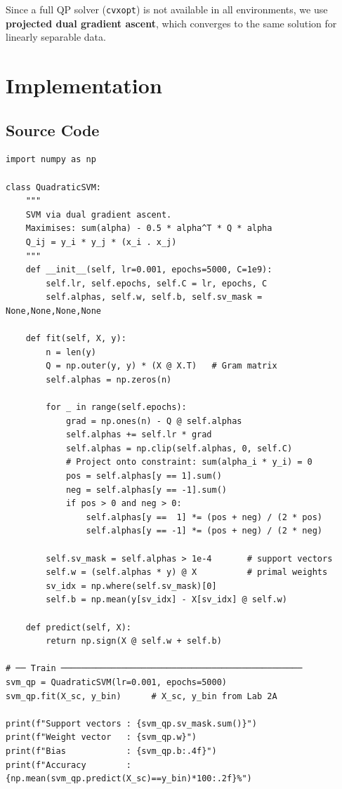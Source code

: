 \documentclass[12pt,a4paper]{article}
\begin{document}
Since a full QP solver (\texttt{cvxopt}) is not available in all environments, we use \textbf{projected dual gradient ascent}, which converges to the same solution for linearly separable data.

\section{Implementation}

\subsection{Source Code}

\begin{lstlisting}[caption={QuadraticSVM — dual gradient ascent}]
import numpy as np

class QuadraticSVM:
    """
    SVM via dual gradient ascent.
    Maximises: sum(alpha) - 0.5 * alpha^T * Q * alpha
    Q_ij = y_i * y_j * (x_i . x_j)
    """
    def __init__(self, lr=0.001, epochs=5000, C=1e9):
        self.lr, self.epochs, self.C = lr, epochs, C
        self.alphas, self.w, self.b, self.sv_mask = None,None,None,None

    def fit(self, X, y):
        n = len(y)
        Q = np.outer(y, y) * (X @ X.T)   # Gram matrix
        self.alphas = np.zeros(n)

        for _ in range(self.epochs):
            grad = np.ones(n) - Q @ self.alphas
            self.alphas += self.lr * grad
            self.alphas = np.clip(self.alphas, 0, self.C)
            # Project onto constraint: sum(alpha_i * y_i) = 0
            pos = self.alphas[y == 1].sum()
            neg = self.alphas[y == -1].sum()
            if pos > 0 and neg > 0:
                self.alphas[y ==  1] *= (pos + neg) / (2 * pos)
                self.alphas[y == -1] *= (pos + neg) / (2 * neg)

        self.sv_mask = self.alphas > 1e-4       # support vectors
        self.w = (self.alphas * y) @ X          # primal weights
        sv_idx = np.where(self.sv_mask)[0]
        self.b = np.mean(y[sv_idx] - X[sv_idx] @ self.w)

    def predict(self, X):
        return np.sign(X @ self.w + self.b)

# ── Train ────────────────────────────────────────────────
svm_qp = QuadraticSVM(lr=0.001, epochs=5000)
svm_qp.fit(X_sc, y_bin)      # X_sc, y_bin from Lab 2A

print(f"Support vectors : {svm_qp.sv_mask.sum()}")
print(f"Weight vector   : {svm_qp.w}")
print(f"Bias            : {svm_qp.b:.4f}")
print(f"Accuracy        : {np.mean(svm_qp.predict(X_sc)==y_bin)*100:.2f}%")
\end{lstlisting}
\end{document}
